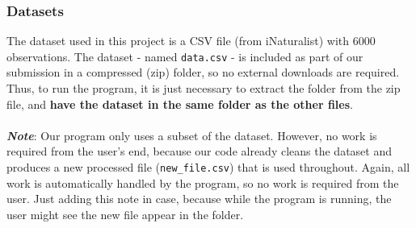 \documentclass{article}
\begin{document}
\subsubsection{Datasets}
The dataset used in this project is a CSV file (from iNaturalist) with 6000 observations. The dataset - named \texttt{data.csv} - is included as part of our submission in a compressed (zip) folder, so no external downloads are required. Thus, to run the program, it is just necessary to extract the folder from the zip file, and \textbf{have the dataset in the same folder as the other files}. \\ \\
\textit{\textbf{Note}}: Our program only uses a subset of the dataset. However, no work is required from the user's end, because our code already cleans the dataset and produces a new processed file (\texttt{new\_file.csv}) that is used throughout. Again, all work is automatically handled by the program, so no work is required from the user. Just adding this note in case, because while the program is running, the user might see the new file appear in the folder. 
\end{document}
